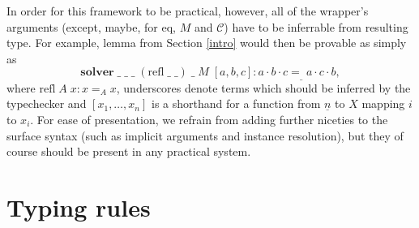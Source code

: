 \documentclass[manuscript,screen,review]{acmart}
\begin{document}
In order for this framework to be practical, however, all of the wrapper's
arguments (except, maybe, for $\mathrm{eq}$, $M$ and $\mathcal{C}$) have to be
inferrable from resulting type. For example, lemma from Section \ref{intro}
would then be provable as simply as
\[
  \mathbf{solver}\;\_\;\_\;\_\;(\mathrm{refl}\;\_\;\_)\;\_\;M\;[a,b,c]
  :a\cdot b\cdot c=_{\_}a\cdot c\cdot b,
\]
where $\mathrm{refl}\;A\;x:x=_A x$, underscores denote terms which should be
inferred by the typechecker and $[x_1,\ldots,x_n]$ is a shorthand for a function
from $\underline{n}$ to $X$ mapping $i$ to $x_i$. For ease of presentation, we
refrain from adding further niceties to the surface syntax (such as implicit
arguments and instance resolution), but they of course should be present in any
practical system.


\section{Typing rules} \label{typing}
\end{document}
